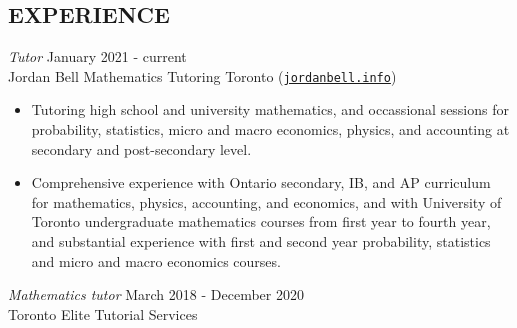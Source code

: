 \documentclass[margin, 10pt]{res} %
\begin{document}
\begin{resume}

 



 
\section{EXPERIENCE}

{\sl Tutor} \hfill January 2021 - current \\
Jordan Bell Mathematics Tutoring Toronto (\href{https://jordanbell.info/}{\texttt{jordanbell.info}})

\begin{itemize} \itemsep -2pt %
\item Tutoring high school and university mathematics, and occassional sessions for
probability, statistics, micro and macro economics, physics, and accounting at secondary and post-secondary level.

\item Comprehensive experience with Ontario secondary, IB, and AP curriculum for mathematics, physics, accounting, and economics, and with University of Toronto undergraduate mathematics courses from first year to fourth year, and substantial experience with first and second year probability, statistics and micro and macro economics courses.
\end{itemize}

{\sl Mathematics tutor} \hfill March 2018 - December 2020 \\
Toronto Elite Tutorial Services


\end{resume}
\end{document}
